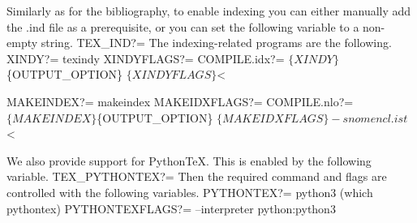 Similarly as for the bibliography, to enable indexing you can either manually 
add the {\Tt{}.ind\nwendquote} file as a prerequisite, or you can set the following variable 
to a non-empty string.
\nwenddocs{}\plusendmoddef\nwstartdeflinemarkup{}\nwenddeflinemarkup
TEX_IND?=
\nwendcode{}The indexing-related programs are the following.
\nwenddocs{}\plusendmoddef\nwstartdeflinemarkup{}\nwenddeflinemarkup
XINDY?=       texindy
XINDYFLAGS?=
COMPILE.idx?= $\{XINDY\} $\{OUTPUT_OPTION\} $\{XINDYFLAGS\} $<

MAKEINDEX?=   makeindex
MAKEIDXFLAGS?=
COMPILE.nlo?= $\{MAKEINDEX\} $\{OUTPUT_OPTION\} $\{MAKEIDXFLAGS\} -s nomencl.ist $<
\nwendcode{}\nwdocspar

We also provide support for PythonTeX.
This is enabled by the following variable.
\nwenddocs{}\plusendmoddef\nwstartdeflinemarkup{}\nwenddeflinemarkup
TEX_PYTHONTEX?=
\nwendcode{}Then the required command and flags are controlled with the following 
variables.
\nwenddocs{}\plusendmoddef\nwstartdeflinemarkup{}\nwenddeflinemarkup
PYTHONTEX?=       python3 $$(which pythontex)
PYTHONTEXFLAGS?=  --interpreter python:python3
\nwendcode{}\nwdocspar

